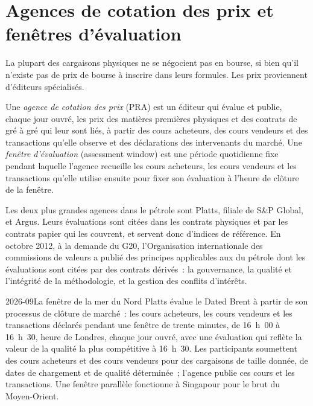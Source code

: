 \section{Agences de cotation des prix et fenêtres d'évaluation}

La plupart des cargaisons physiques ne se négocient pas en bourse, si bien qu'il n'existe pas
de prix de bourse à inscrire dans leurs formules. Les prix proviennent d'éditeurs spécialisés.

\begin{definition}\label{def:m3:physical-commodity-markets:pra}
Une \emph{agence de cotation des prix} (PRA) est un éditeur
qui évalue et publie, chaque jour ouvré, les prix des matières premières physiques
et des contrats de gré à gré qui leur sont liés, à partir des cours acheteurs, des cours vendeurs et des transactions qu'elle observe
et des déclarations des intervenants du marché. Une \emph{fenêtre
d'évaluation} (assessment window) est une période quotidienne fixe pendant laquelle l'agence
recueille les cours acheteurs, les cours vendeurs et les transactions qu'elle utilise ensuite pour fixer son évaluation à
l'heure de clôture de la fenêtre.
\end{definition}

Les deux plus grandes agences dans le pétrole sont Platts, filiale de S\&P Global, et Argus. Leurs
évaluations sont citées dans les contrats physiques et par les contrats papier qui
les couvrent, et servent donc d'indices de référence. En octobre 2012, à la demande du
G20, l'Organisation internationale des commissions de valeurs a publié
des principes applicables aux  du pétrole dont les évaluations sont citées par
des contrats dérivés~: la gouvernance, la qualité et l'intégrité de la méthodologie,
et la gestion des conflits d'intérêts.

\begin{dated}{2026-09}{La fenêtre de la mer du Nord}\label{dat:m3:physical-commodity-markets:moc}
Platts évalue le Dated Brent à partir de son processus de clôture de marché~: les cours acheteurs, les cours vendeurs et les transactions déclarés pendant une fenêtre de trente minutes,
de 16~h~00 à 16~h~30, heure de Londres, chaque jour ouvré,
avec une évaluation qui reflète la valeur de la qualité la plus compétitive à 16~h~30.
Les participants soumettent des cours acheteurs et des cours vendeurs pour des cargaisons de taille donnée, de dates de chargement et
de qualité déterminée~; l'agence publie ces cours et les transactions. Une fenêtre parallèle fonctionne à Singapour
pour le brut du Moyen-Orient.
\end{dated}

